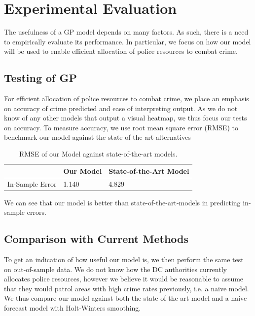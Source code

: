 \documentclass[letterpaper]{article}
\begin{document}
	\section{Experimental Evaluation}
	The usefulness of a GP model depends on many factors. As such, there is a need to empirically evaluate its performance.
	In particular, we focus on how our model will be used to enable efficient allocation of police resources to combat crime.

	\subsection{Testing of GP}
	For efficient allocation of police resources to combat crime, we place an emphasis on accuracy of crime predicted and ease of interpreting output.
	As we do not know of any other models that output a visual heatmap, we thus focus our tests on accuracy.
	To measure accuracy, we use root mean square error (RMSE) to benchmark our model against the state-of-the-art alternatives \cite{c06}
	

	\begin{table}[!ht]
		\resizebox{\linewidth}{!} {
		\begin{tabular}{| l | l | l | }
		\hline
		& Our Model & State-of-the-Art Model \\ \hline
		In-Sample Error & 1.140 & 4.829\\
		\hline
		\end{tabular}
		}
		\caption{RMSE of our Model against state-of-the-art models.}
		\label{t1}
	\end{table}
	
	We can see that our model is better than state-of-the-art-models in predicting in-sample errors.

	\subsection{Comparison with Current Methods}
	
	To get an indication of how useful our model is, we then perform the same test on out-of-sample data.
	We do not know how the DC authorities currently allocates police resources, however we believe it would be reasonable to assume that they would patrol areas with high crime rates previously, i.e. a naive model.
	We thus compare our model against both the state of the art model and a naive forecast model with Holt-Winters smoothing.
	
\end{document}
